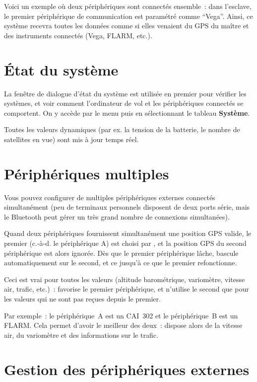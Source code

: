 Voici un exemple où deux périphériques sont connectés ensemble~: dans l'esclave, le premier périphérique de communication est paramétré comme ``Vega''. Ainsi, ce système recevra toutes les données comme si elles venaient du GPS du maître et des instruments connectés (Vega, FLARM, etc.).

\section{État du système}\label{sec:system-status}

La fenêtre de dialogue d'état du système est
utilisée en premier pour vérifier les systèmes, et voir comment l'ordinateur de vol et les périphériques connectés se comportent.
On y accède par le menu puis en sélectionnant le tableau \textbf{Système}.

Toutes les valeurs dynamiques (par ex. la tension de la batterie, le nombre de satellites en vue) sont mis à jour temps réel.

\section{Périphériques multiples}

Vous pouvez configurer de multiples périphériques externes connectés simultanément (peu de terminaux personnels disposent de deux ports série, mais le Bluetooth peut gérer un très grand nombre de connexions simultanées).

Quand deux périphériques fournissent simultanément une position GPS valide, le premier (c.-à-d. le périphérique A) est choisi par \xc, et la position GPS du second périphérique est alors ignorée.
Dès que le premier périphérique lâche, \xc{} bascule automatiquement sur le second, et ce jusqu'à ce que le premier refonctionne.

Ceci est vrai pour toutes les valeurs (altitude barométrique, variomètre, vitesse air, trafic, etc.)~: \xc{} favorise le premier périphérique, et n'utilise le second que pour les valeurs qui ne sont pas reçues depuis le premier.

Par exemple~: le périphérique~A est un CAI~302 et le périphérique~B est un FLARM. 
Cela permet d'avoir le meilleur des deux~: \xc{} dispose alors de la vitesse air, du variomètre et des informations sur le trafic.

\section{Gestion des périphériques externes}

